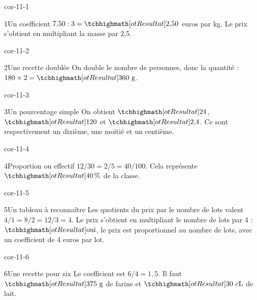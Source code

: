 \clearpage\pagestyle{otMain}\setlength{\otBlocEspacement}{2.5mm}\fontsize{11}{15}\selectfont{}
\begin{blocLivre}{cor-11-1}\begin{corrige}{1}{Un coefficient}
$7{,}50:3=\res{2{,}50}$ euros par kg. Le prix s’obtient en multipliant la masse par 2,5.
\end{corrige}\end{blocLivre}
\begin{blocLivre}{cor-11-2}\begin{corrige}{2}{Une recette doublée}
On double le nombre de personnes, donc la quantité : $180\times2=\res{360\ \mathrm g}$.
\end{corrige}\end{blocLivre}
\begin{blocLivre}{cor-11-3}\begin{corrige}{3}{Un pourcentage simple}
On obtient $\res{24}$, $\res{120}$ et $\res{2{,}4}$. Ce sont respectivement un dixième, une moitié et un centième.
\end{corrige}\end{blocLivre}
\begin{blocLivre}{cor-11-4}\begin{corrige}{4}{Proportion ou effectif}
$12/30=2/5=40/100$. Cela représente $\res{40\,\%}$ de la classe.
\end{corrige}\end{blocLivre}
\begin{blocLivre}{cor-11-5}\begin{corrige}{5}{Un tableau à reconnaître}
Les quotients du prix par le nombre de lots valent $4/1=8/2=12/3=4$. Le prix s’obtient en multipliant le nombre de lots par 4 : $\res{\text{oui}}$, le prix est proportionnel au nombre de lots, avec un coefficient de 4 euros par lot.
\end{corrige}\end{blocLivre}
\begin{blocLivre}{cor-11-6}\begin{corrige}{6}{Une recette pour six}
Le coefficient est $6/4=1{,}5$. Il faut $\res{375\ \mathrm g}$ de farine et $\res{30\ \mathrm{cL}}$ de lait.
\end{corrige}\end{blocLivre}
